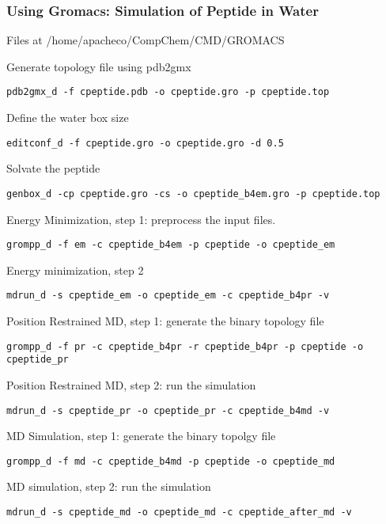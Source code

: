 \documentclass[slidestop,mathserif,compress,xcolor=svgnames]{beamer}
\newenvironment{eblock}[0]
{
\begin{beamerboxesrounded}[upper=uppercol2,lower=lowercol2,shadow=true]}
{\end{beamerboxesrounded}}
\begin{document}
\begin{frame}
  \frametitle{\small Using Gromacs: Simulation of Peptide in Water}
  \begin{eblock}{Files at /home/apacheco/CompChem/CMD/GROMACS}
    \begin{enumerate}
      {\tiny
      \item Generate topology file using pdb2gmx
      \item[] \texttt{{\color{magenta}pdb2gmx\_d} -f {\color{blue}cpeptide.pdb} -o {\color{DarkGreen}cpeptide.gro} -p {\color{DarkGreen}cpeptide.top}}
      \item Define the water box size
      \item[] \texttt{{\color{magenta}editconf\_d} -f {\color{blue}cpeptide.gro} -o {\color{DarkGreen}cpeptide.gro} -d 0.5}
      \item Solvate the peptide
      \item[] \texttt{{\color{magenta}genbox\_d} -cp {\color{blue}cpeptide.gro} -cs -o {\color{DarkGreen}cpeptide\_b4em.gro} -p {\color{DarkGreen}cpeptide.top}}
      \item Energy Minimization, step 1: preprocess the input files.
      \item[] \texttt{{\color{magenta}grompp\_d} -f {\color{red}em} -c {\color{blue}cpeptide\_b4em} -p {\color{blue}cpeptide} -o {\color{DarkGreen}cpeptide\_em}}
      \item Energy minimization, step 2
      \item[] \texttt{{\color{magenta}mdrun\_d} -s {\color{blue}cpeptide\_em} -o {\color{DarkGreen}cpeptide\_em} -c {\color{DarkGreen}cpeptide\_b4pr} -v }
      \item Position Restrained MD, step 1: generate the binary topology file
      \item[] \texttt{{\color{magenta}grompp\_d} -f {\color{blue}pr} -c {\color{blue}cpeptide\_b4pr} -r {\color{blue}cpeptide\_b4pr} -p {\color{blue}cpeptide} -o {\color{DarkGreen}cpeptide\_pr} }
      \item Position Restrained MD, step 2: run the simulation
      \item[] \texttt{{\color{magenta}mdrun\_d} -s {\color{blue}cpeptide\_pr} -o {\color{DarkGreen}cpeptide\_pr} -c {\color{DarkGreen}cpeptide\_b4md} -v}
      \item MD Simulation, step 1: generate the binary topolgy file
      \item[]\texttt{{\color{magenta}grompp\_d} -f {\color{blue}md} -c {\color{blue}cpeptide\_b4md}  -p {\color{blue}cpeptide} -o {\color{DarkGreen}cpeptide\_md} }
      \item MD simulation, step 2: run the simulation
      \item[] \texttt{{\color{magenta}mdrun\_d} -s {\color{blue}cpeptide\_md} -o {\color{blue}cpeptide\_md} -c {\color{DarkGreen}cpeptide\_after\_md} -v }

      }
    \end{enumerate}
  \end{eblock}
\end{frame}
\end{document}
